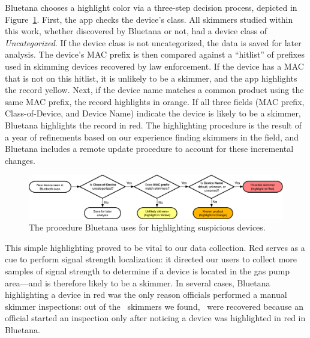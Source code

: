 %
%



Bluetana chooses a highlight color via a three-step decision process, depicted in Figure~\ref{fig:bluetana-flagging-flow}.
%
First, the app checks the device's class.
%
All skimmers studied within this work, whether discovered by Bluetana or not, had a device class of \emph{Uncategorized}.
%
If the device class is not uncategorized, the data is saved for later analysis.
%
The device's MAC prefix is then compared against a ``hitlist'' of prefixes used in skimming devices recovered by law enforcement.
%
If the device has a MAC that is not on this hitlist, it is unlikely to be a skimmer, and the app highlights the record yellow.
%
Next, if the device name matches a common product using the same MAC prefix, the record highlights in orange.
%
If all three fields (MAC prefix, Class-of-Device, and Device Name) indicate the device is likely to be a skimmer, Bluetana highlights the record in red.
%
The highlighting procedure is the result of a year of refinements based on our experience finding skimmers in the field, and Bluetana includes a remote update procedure to account for these incremental changes.

\begin{figure}[!h]
  \centering
  \captionsetup{justification=centering}
  \includegraphics[width=\linewidth]{skimmer/fig/bluetana-flagging-flow}
  \caption{
  The procedure Bluetana uses for highlighting suspicious devices.
  \label{fig:bluetana-flagging-flow}
  }
  \end{figure}
  

This simple highlighting proved to be vital to our data collection.
%
Red serves as a cue to perform signal strength localization:
%
it directed our users to collect more samples of signal strength to determine
if a device is located in the gas pump area---and is therefore likely to
be a skimmer. 
%
In several cases, Bluetana highlighting a device in red was the only reason officials performed a manual skimmer inspections:
%
out of the \totalskimmers~skimmers we found, \Bluetanaskimmerfield~were recovered
because an official started an inspection only after noticing a device was highlighted in red in Bluetana.
%

